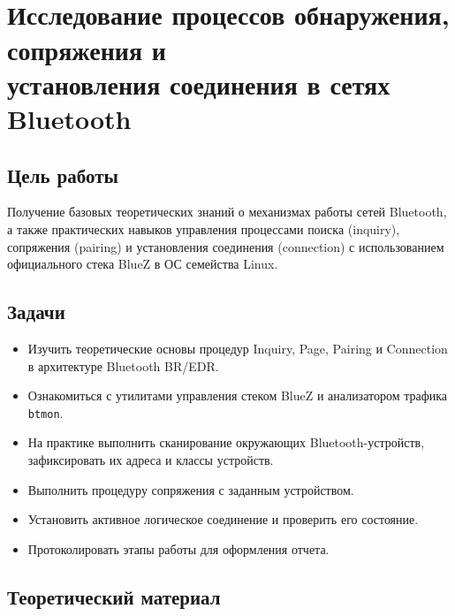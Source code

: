 \section[Исследование процессов обнаружения, сопряжения и установления соединения в сетях Bluetooth]
{\\Исследование процессов обнаружения, сопряжения и \\установления соединения в сетях Bluetooth}

\subsection{Цель работы}
Получение базовых теоретических знаний о механизмах работы сетей Bluetooth, а также практических навыков управления процессами поиска (inquiry), сопряжения (pairing) и установления соединения (connection) с использованием официального стека BlueZ в ОС семейства Linux.

\subsection{Задачи}
\begin{itemize}[nosep]
    \item Изучить теоретические основы процедур Inquiry, Page, Pairing и Connection в архитектуре Bluetooth BR/EDR.
    \item Ознакомиться с утилитами управления стеком BlueZ и анализатором трафика \texttt{btmon}.
    \item На практике выполнить сканирование окружающих Bluetooth-устройств, зафиксировать их адреса и классы устройств.
    \item Выполнить процедуру сопряжения с заданным устройством.
    \item Установить активное логическое соединение и проверить его состояние.
    \item Протоколировать этапы работы для оформления отчета.
\end{itemize}

\subsection{Теоретический материал}

